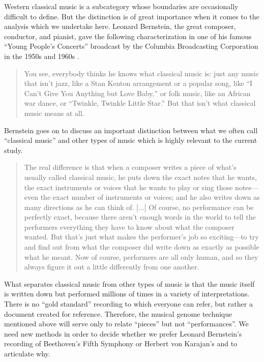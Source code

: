 \documentclass[12pt]{article}
\begin{document}
Western classical music is a subcategory
whose boundaries are occasionally difficult to define. But
the distinction is of great importance when it comes to the analysis
which we undertake here. Leonard Bernstein, the great composer,
conductor, and pianist, gave the following characterization in one of his famous
``Young People's Concerts''
broadcast by the Columbia Broadcasting Corporation in the 1950s and
1960s \citep{Bernstein2005}.
\begin{quote}
  You see, everybody thinks he knows what classical music is: just any music that isn't jazz,
  like a Stan Kenton arrangement or a popular song, like ``I Can't Give
  You Anything but Love Baby,'' or folk music, like an African war
  dance, or ``Twinkle, Twinkle Little Star.'' But that isn't what
  classical music means at all.
\end{quote}
Bernstein goes on to discuss an important distinction between what
we often call ``classical music'' and other types of music which is
highly relevant to the current study.
\begin{quote}
  The real difference is that when a composer
  writes a piece of what's usually called classical music, he puts down
  the exact notes that he wants, the exact instruments or voices that he
  wants to play or sing those notes---even the exact number of
  instruments or voices; and he also writes down as many directions as
  he can think of. [...] Of course, no performance can be perfectly exact, because there
  aren't enough words in the world to tell the performers everything
  they have to know about what the composer wanted. But that's just what
  makes the performer's job so exciting---to try and find out from what
  the composer did write down as exactly as possible what he meant. Now
  of course, performers are all only human, and so they always figure it
  out a little differently from one another.  
\end{quote}
What separates classical music from other types of music is that the
music itself is written down but performed millions of times in a
variety of interpretations. There is no ``gold standard'' recording to
which everyone can refer, but rather a document created for
reference. Therefore, the musical genome technique mentioned above
will serve only to relate ``pieces'' but not ``performances''. We need
new methods in order to decide whether we prefer Leonard Bernstein's
recording of Beethoven's Fifth Symphony or Herbert von Karajan's and
to articulate why.
\end{document}
